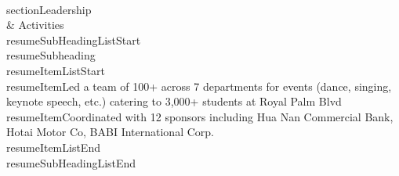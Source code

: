 \documentclass[letterpaper,11pt]{article}
\makeatletter
\newcommand{\resumeItem}[1]{
  \item\small{
    {#1 \vspace{-2pt}}
  }
}
\newcommand{\resumeSubheading}[4]{
  \vspace{-2pt}\item
    \begin{tabular*}{0.97\textwidth}[t]{l@{\extracolsep{\fill}}r}
      \textbf{#1} & #2 \\
      \textit{\small#3} & \textit{\small #4} \\
    \end{tabular*}\vspace{-7pt}
}
\newcommand{\resumeSubHeadingListStart}{\begin{itemize}[leftmargin=0.15in, label={}]}
\newcommand{\resumeSubHeadingListEnd}{\end{itemize}}
\newcommand{\resumeItemListStart}{\begin{itemize}}
\newcommand{\resumeItemListEnd}{\end{itemize}\vspace{-5pt}}
\makeatother
\begin{document}
\\section{Leadership \\& Activities}\n  \\resumeSubHeadingListStart\n    \\resumeSubheading{}\n      {}{}\n      \\resumeItemListStart\n        \\resumeItem{Led a team of 100+ across 7 departments for events (dance, singing, keynote speech, etc.) catering to 3,000+ students at Royal Palm Blvd}\n        \\resumeItem{Coordinated with 12 sponsors including Hua Nan Commercial Bank, Hotai Motor Co, BABI International Corp.}\n      \\resumeItemListEnd\n  \\resumeSubHeadingListEnd\n
\end{document}
